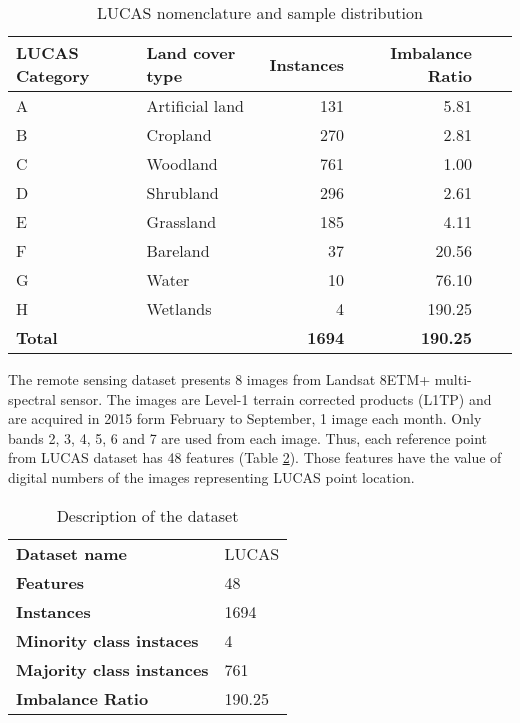 \documentclass[parskip=full]{scrartcl}
\begin{document}
\begin{table}[H]
	\centering
	\begin{tabular}{llrrrr}
		\toprule
		\textbf{LUCAS Category} & \textbf{Land cover type} & \textbf{Instances}
		& \textbf{Imbalance Ratio} \\
		\hline
		A & Artificial land & 131 & 5.81 \\
		B & Cropland        & 270 & 2.81 \\
		C & Woodland        & 761 & 1.00 \\
		D & Shrubland       & 296 & 2.61 \\
		E & Grassland       & 185 & 4.11 \\
		F & Bareland        & 37  & 20.56 \\
		G & Water           & 10  & 76.10 \\
		H & Wetlands        & 4   & 190.25\\
		\hline
		\textbf{Total} & & \textbf{1694} &  \textbf{190.25} \\
		\bottomrule
	\end{tabular}
	\caption{\label{tab:dataset_classes}LUCAS nomenclature and sample distribution}
\end{table}

The remote sensing dataset presents 8 images from Landsat 8ETM+ multi-spectral
sensor. The images are Level-1 terrain corrected products (L1TP) and are
acquired in 2015 form February to September, 1 image each month. Only bands 2,
3, 4, 5, 6 and 7 are used from each image. Thus, each reference point from
LUCAS dataset has 48 features (Table \ref{tab:datasets}). Those features have
the value of digital numbers of the images representing LUCAS point location.


\begin{table}[H]
	\centering
	\begin{tabular}{ll}
		\toprule
		\textbf{Dataset name}             &  				 LUCAS \\
		\textbf{Features}                 &             48 \\
		\textbf{Instances}                &           1694 \\
		\textbf{Minority class instaces}  &              4 \\
		\textbf{Majority class instances} &            761 \\
		\textbf{Imbalance Ratio}          &         190.25 \\
	\bottomrule
	\end{tabular}
	\caption{\label{tab:datasets}Description of the dataset}
\end{table}
\end{document}
